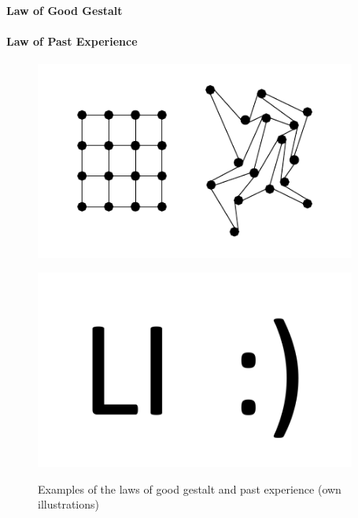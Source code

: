 \paragraph*{Law of Good Gestalt}
\paragraph*{Law of Past Experience}\begin{figure}[H] 
    \begin{minipage}[b]{.5\linewidth}
        \centering\includegraphics[width=0.94\textwidth]{img/gestalt.pdf}
        \label{fig:gest}
    \end{minipage}%
    \begin{minipage}[b]{.5\linewidth}
        \centering\includegraphics[width=0.94\textwidth]{img/experience.pdf}
        \label{fig:exo}
    \end{minipage}
    \caption[Laws of Good Gestalt and Past Experience]{Examples of the laws of good gestalt and past experience (own illustrations)}\label{fig:law4}
\end{figure}
